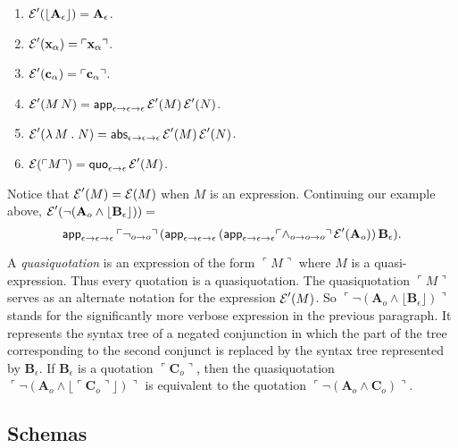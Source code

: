 \documentclass[fleqn]{llncs}
\newcommand{\be}{\begin{enumerate}}
\newcommand{\ee}{\end{enumerate}}
\newcommand{\sE}{\mbox{$\cal E$}}
\newcommand{\synbrack}[1]{\ulcorner#1\urcorner}
\newcommand{\commabrack}[1]{\lfloor#1\rfloor}
\newcommand{\mname}[1]{\mbox{\sf #1}}
\newcommand{\mdot}{\mathrel.}
\newcommand{\tarrow}{\rightarrow}
\newcommand{\LambdaApp}{\lambda\,}
\newcommand{\Neg}{\neg}
\newcommand{\Andd}{\wedge}
\begin{document}
\be

  \item $\sE'(\commabrack{\textbf{A}_\epsilon}) = \textbf{A}_\epsilon$.

  \item $\sE'(\textbf{x}_\alpha) = \synbrack{\textbf{x}_\alpha}$.

  \item $\sE'(\textbf{c}_\alpha) = \synbrack{\textbf{c}_\alpha}$.

  \item $\sE'(M \, N) = \mname{app}_{\epsilon \tarrow \epsilon \tarrow
    \epsilon} \, \sE'(M) \, \sE'(N)$.

  \item $\sE'(\LambdaApp M \mdot N) = \mname{abs}_{\epsilon \tarrow
    \epsilon \tarrow \epsilon} \, \sE'(M) \, \sE'(N)$.

  \item $\sE(\synbrack{M}) = \mname{quo}_{\epsilon \tarrow \epsilon} \,
    \sE'(M)$.

\ee

\noindent
Notice that $\sE'(M) = \sE(M)$ when $M$ is an expression.  Continuing
our example above, $\sE'(\Neg(\textbf{A}_o \Andd
\commabrack{\textbf{B}_\epsilon})) = {}$
\[\mname{app}_{\epsilon \tarrow
  \epsilon \tarrow \epsilon} \, \synbrack{\Neg_{o \tarrow o}} \,
(\mname{app}_{\epsilon \tarrow \epsilon \tarrow \epsilon} \,
(\mname{app}_{\epsilon \tarrow \epsilon \tarrow \epsilon}
\synbrack{\wedge_{o \tarrow o \tarrow o}} \, \sE'(\textbf{A}_o))
\, \textbf{B}_\epsilon).\]

A \emph{quasiquotation} is an expression of the form $\synbrack{M}$
where $M$ is a quasi-expression.  Thus every quotation is a
quasiquotation.  The quasiquotation $\synbrack{M}$ serves as an
alternate notation for the expression $\sE'(M)$.  So
$\synbrack{\Neg(\textbf{A}_o \Andd \commabrack{\textbf{B}_\epsilon})}$
stands for the significantly more verbose expression in the previous
paragraph.  It represents the syntax tree of a negated conjunction in
which the part of the tree corresponding to the second conjunct is
replaced by the syntax tree represented by $\textbf{B}_\epsilon$.  If
$\textbf{B}_\epsilon$ is a quotation $\synbrack{\textbf{C}_o}$, then
the quasiquotation $\synbrack{\Neg(\textbf{A}_o \Andd
  \commabrack{\synbrack{\textbf{C}_o}})}$ is equivalent to the
quotation $\synbrack{\Neg(\textbf{A}_o \Andd \textbf{C}_o)}$.

\subsection{Schemas}
\end{document}
